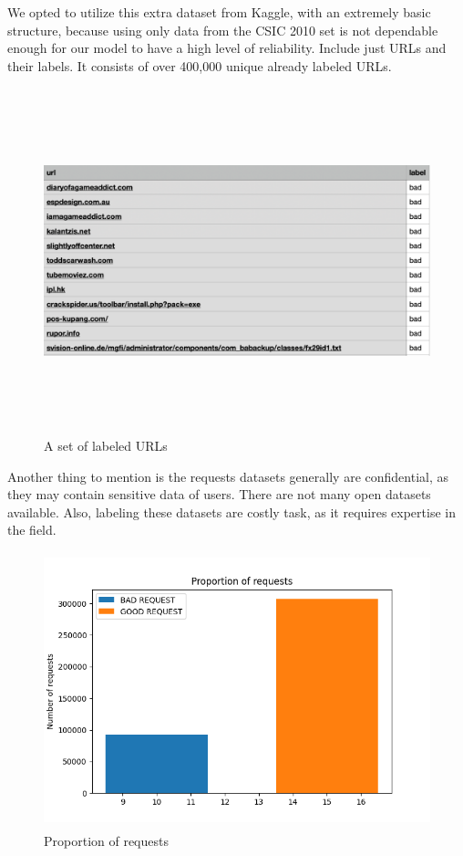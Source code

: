 \hspace{0.5cm}We opted to utilize this extra dataset from Kaggle, with an extremely basic structure, because using only data from the CSIC 2010 set is not dependable enough for our model to have a high level of reliability. Include just URLs and their labels. It consists of over 400,000 unique already labeled URLs.
\begin{figure}[ht]
	\centering
	\includegraphics[width=\linewidth, height=10cm,keepaspectratio]{figures/dataset3.png}
  \caption{A set of labeled URLs}
\end{figure}

Another thing to mention is the requests datasets generally are confidential, as they may contain sensitive data of users. There are not many open datasets available. Also, labeling these datasets are costly task, as it requires expertise in the field.

\begin{figure}[ht]
	\centering
	\includegraphics[width=\linewidth, height=8cm,keepaspectratio]{figures/proportion.png} 
  \caption{Proportion of requests}
\end{figure}


